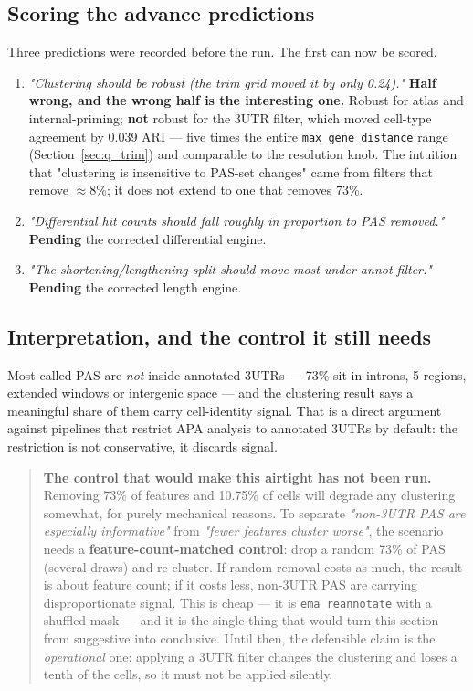 \documentclass[11pt,a4paper]{article}
\begin{document}
\subsection{Scoring the advance predictions}

Three predictions were recorded before the run. The first can now be scored.

\begin{enumerate}[nosep]
  \item \emph{"Clustering should be robust (the trim grid moved it by only
    0.24)."} \textbf{Half wrong, and the wrong half is the interesting one.}
    Robust for atlas and internal-priming; \textbf{not} robust for the
    3\textquotesingle{}UTR filter, which moved cell-type agreement by 0.039 ARI
    --- five times the entire \texttt{max\_gene\_distance} range
    (Section~\ref{sec:q_trim}) and comparable to the resolution knob. The
    intuition that "clustering is insensitive to PAS-set changes" came from
    filters that remove $\approx$8\%; it does not extend to one that removes 73\%.
  \item \emph{"Differential hit counts should fall roughly in proportion to PAS
    removed."} \textbf{Pending} the corrected differential engine.
  \item \emph{"The shortening/lengthening split should move most under
    annot-filter."} \textbf{Pending} the corrected length engine.
\end{enumerate}

\subsection{Interpretation, and the control it still needs}

Most called PAS are \emph{not} inside annotated 3\textquotesingle{}UTRs --- 73\%
sit in introns, 5\textquotesingle{} regions, extended windows or intergenic
space --- and the clustering result says a meaningful share of them carry
cell-identity signal. That is a direct argument against pipelines that restrict
APA analysis to annotated 3\textquotesingle{}UTRs by default: the restriction is
not conservative, it discards signal.

\begin{quote}
\textbf{The control that would make this airtight has not been run.} Removing
73\% of features and 10.75\% of cells will degrade any clustering somewhat, for
purely mechanical reasons. To separate \emph{"non-3\textquotesingle{}UTR PAS are
especially informative"} from \emph{"fewer features cluster worse"}, the
scenario needs a \textbf{feature-count-matched control}: drop a random 73\% of
PAS (several draws) and re-cluster. If random removal costs as much, the result
is about feature count; if it costs less, non-3\textquotesingle{}UTR PAS are
carrying disproportionate signal. This is cheap --- it is \texttt{ema reannotate}
with a shuffled mask --- and it is the single thing that would turn this section
from suggestive into conclusive. Until then, the defensible claim is the
\emph{operational} one: applying a 3\textquotesingle{}UTR filter changes the
clustering and loses a tenth of the cells, so it must not be applied silently.
\end{quote}
\end{document}
